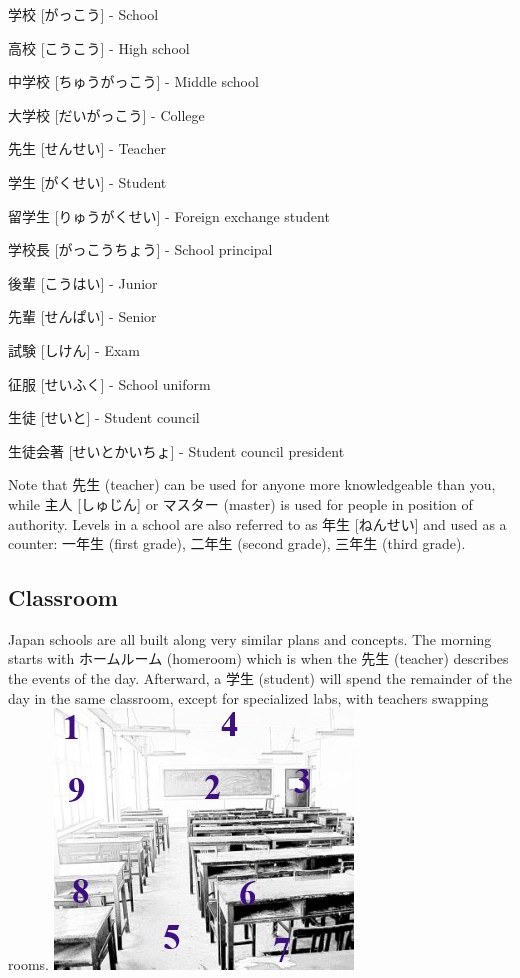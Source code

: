 \documentclass{article}
\begin{document}
\begin{CJK}{UTF8}{min}
\begin{multicols*}{3}
\begin{colorize}
\item 学校 [がっこう] - School
\item 高校 [こうこう] - High school
\item 中学校 [ちゅうがっこう] - Middle school
\item 大学校 [だいがっこう] - College
\item 先生 [せんせい] - Teacher
\item 学生 [がくせい] - Student
\item 留学生 [りゅうがくせい] - Foreign exchange student
\item 学校長 [がっこうちょう] - School principal
\item 後輩 [こうはい] - Junior
\item 先輩 [せんぱい] - Senior
\item 試験 [しけん] - Exam
\item 征服 [せいふく] - School uniform
\item 生徒 [せいと] - Student council
\item 生徒会著 [せいとかいちょ] - Student council president
\end{colorize}

Note that 先生 (teacher) can be used for anyone more knowledgeable than you, while 主人 [しゅじん] or マスター (master) is used for people in position of authority. Levels in a 
school are also referred to as 年生 [ねんせい] and used as a counter: 一年生 (first grade), 二年生 (second grade), 三年生 (third grade).

\subsection{Classroom}

Japan schools are all built along very similar plans and concepts. The morning starts with ホームルーム (homeroom) which is when the 先生 (teacher) describes the events of 
the day. Afterward, a 学生 (student) will spend the remainder of the day in the same classroom, except for specialized labs, with teachers swapping rooms.
\includegraphics{classroom}


\end{multicols*}
\end{CJK}
\end{document}
